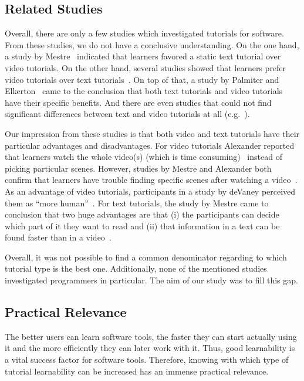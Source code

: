 \subsection{Related Studies} 
\label{subsec:related}





Overall, there are only a few studies which investigated tutorials for software. From these studies, we do not have a conclusive understanding.
On the one hand, a study by Mestre~\cite{mestre} indicated that learners favored a static text tutorial over video tutorials.
On the other hand, several studies showed that learners prefer video tutorials over text tutorials~\cite{baecker, vanderMeij, lloyd}. 
On top of that, a study by Palmiter and Elkerton~\cite{palmiter} came to the conclusion that both text tutorials and video tutorials have their specific benefits.
And there are even studies that could not find significant differences between text and video tutorials at all (e.g.~\cite{payne, alexander, deVaney}). 

Our impression from these studies is that both video and text tutorials have their particular advantages and disadvantages. For video tutorials Alexander reported that learners watch the whole video(s) (which is time consuming)~\cite{alexander} instead of picking particular scenes. However, studies by Mestre and Alexander both confirm that learners have trouble finding specific scenes after watching a video~\cite{mestre, alexander}. As an advantage of video tutorials, participants in a study by deVaney perceived them as \enquote{more human}~\cite{deVaney}.  For text tutorials, the study by Mestre came to conclusion that two huge advantages are that (i) the participants can decide which part of it they want to read and (ii) that information in a text can be found faster than in a video~\cite{mestre}.

Overall, it was not possible to find a common denominator regarding to which tutorial type is the best one. Additionally, none of the mentioned studies investigated programmers in particular. The aim of our study was to fill this gap. 




\subsection{Practical Relevance}
The better users can learn software tools, the faster they can start actually using it and the more efficiently they can later work with it. Thus, good learnability is a vital success factor for software tools. Therefore, knowing with which type of tutorial learnability can be increased has an immense practical relevance. 

